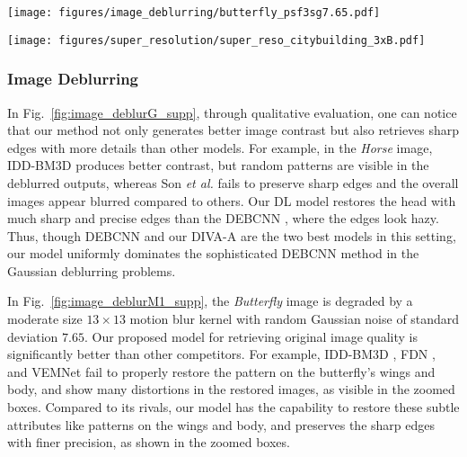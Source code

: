\documentclass[10pt,journal,compsoc]{IEEEtran}
\begin{document}
\begin{figure*}[t!]
\begin{centering}
\texttt{[image: figures/image\_deblurring/butterfly\_psf3sg7.65.pdf]}
\end{centering}

\caption{Deblurring results for motion blur kernel. The restored \textit{Butterfly} images with $13 \times 13$ motion blur kernel and Gaussian noise of standard deviation $7.65$.}
\label{fig:image_deblurM1_supp}
\end{figure*}


\begin{figure*}[t!]
\begin{centering}
\texttt{[image: figures/super\_resolution/super\_reso\_citybuilding\_3xB.pdf]}
\end{centering}

\caption{A zoomed regions of the restored HR \textit{City-building} images, extracted from SR results for a bicubic downsampling with scaling factor 3.}
\label{fig:image_super_resoBx3_supp}
\end{figure*}




\subsubsection{Image Deblurring}
\label{sec:result_deblur_supp}


In Fig.~\ref{fig:image_deblurG_supp}, through qualitative evaluation, one can notice that our method not only generates better image contrast but also retrieves sharp edges with more details than other models.  For example, in the \textit{Horse} image, IDD-BM3D \cite{Danielyan2012bm3d} produces better contrast, but random patterns are visible in the deblurred outputs, whereas Son \textit{et al.} \cite{Son2017fast} fails to preserve sharp edges and the overall images appear blurred compared to others. Our DL model restores the head with much sharp and precise edges than the DEBCNN \cite{Wang2018training}, where the edges look hazy. Thus, though DEBCNN \cite{Wang2018training} and our DIVA-A are the two best models in this setting, our model uniformly dominates the sophisticated DEBCNN \cite{Wang2018training} method in the Gaussian deblurring problems.



In Fig.~\ref{fig:image_deblurM1_supp}, the \textit{Butterfly} image is degraded by a moderate size $13 \times 13$ motion blur kernel with random Gaussian noise of standard deviation $7.65$. Our proposed model for retrieving original image quality is significantly better than other competitors. For example, IDD-BM3D \cite{Danielyan2012bm3d}, FDN \cite{Kruse2017learning}, and VEMNet \cite{Nan2020variational} fail to properly restore the pattern on the butterfly's wings and body, and show many distortions in the restored images, as visible in the zoomed boxes. Compared to its rivals, our model has the capability to restore these subtle attributes like patterns on the wings and body, and preserves the sharp edges with finer precision, as shown in the zoomed boxes.
\end{document}
